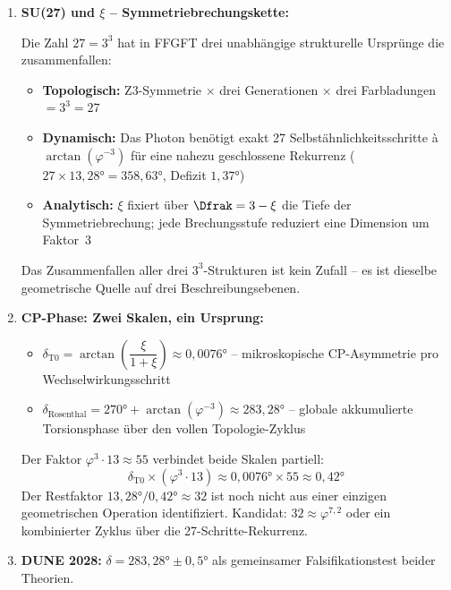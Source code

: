 \begin{enumerate}
  Die drei primitiven Windungsklassen entsprechen den drei Z3-Sektoren der Torus-Topologie -- Generationen sind keine zusätzliche Eingabe sondern topologische Konsequenz.

  \item \textbf{SU(27) und $\xi$ -- Symmetriebrechungskette:}

  Die Zahl $27 = 3^3$ hat in FFGFT drei unabhängige strukturelle Ursprünge die zusammenfallen:
  \begin{itemize}[noitemsep]
    \item \textbf{Topologisch:} Z3-Symmetrie $\times$ drei Generationen $\times$ drei Farbladungen $= 3^3 = 27$
    \item \textbf{Dynamisch:} Das Photon benötigt exakt 27 Selbstähnlichkeitsschritte à $\arctan(\varphi^{-3})$ für eine nahezu geschlossene Rekurrenz ($27 \times 13{,}28° = 358{,}63°$, Defizit $1{,}37°$)
    \item \textbf{Analytisch:} $\xi$ fixiert über $\Dfrak = 3 - \xi$ die Tiefe der Symmetriebrechung; jede Brechungsstufe reduziert eine Dimension um Faktor~3
  \end{itemize}
  Das Zusammenfallen aller drei $3^3$-Strukturen ist kein Zufall -- es ist dieselbe geometrische Quelle auf drei Beschreibungsebenen.

  \item \textbf{CP-Phase: Zwei Skalen, ein Ursprung:}
  \begin{itemize}[noitemsep]
    \item $\delta_{\text{T0}} = \arctan\!\left(\dfrac{\xi}{1+\xi}\right) \approx 0{,}0076°$ -- mikroskopische CP-Asymmetrie pro Wechselwirkungsschritt
    \item $\delta_{\text{Rosenthal}} = 270° + \arctan(\varphi^{-3}) \approx 283{,}28°$ -- globale akkumulierte Torsionsphase über den vollen Topologie-Zyklus
  \end{itemize}

  Der Faktor $\varphi^3 \cdot 13 \approx 55$ verbindet beide Skalen partiell:
  \[
    \delta_{\text{T0}} \times (\varphi^3 \cdot 13) \approx 0{,}0076° \times 55 \approx 0{,}42°
  \]
  Der Restfaktor $13{,}28° / 0{,}42° \approx 32$ ist noch nicht aus einer einzigen geometrischen Operation identifiziert. Kandidat: $32 \approx \varphi^{7{,}2}$ oder ein kombinierter Zyklus über die 27-Schritte-Rekurrenz.

  \item \textbf{DUNE 2028:} $\delta = 283{,}28° \pm 0{,}5°$ als gemeinsamer Falsifikationstest beider Theorien.

\end{enumerate}

